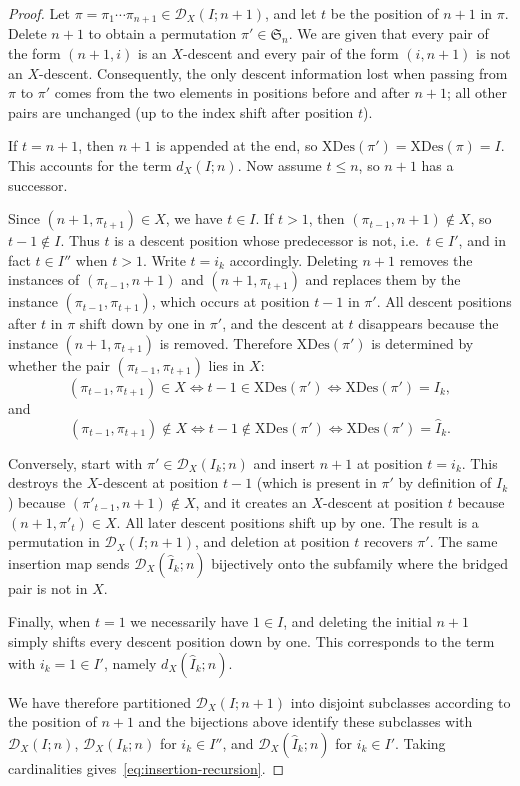 \documentclass[12pt]{amsart}
\theoremstyle{definition}
\theoremstyle{remark}
\newcommand{\Sset}{\mathfrak{S}}
\newcommand{\XD}{\mathrm{XDes}}
\begin{document}
\begin{proof}
Let \(\pi=\pi_1\cdots\pi_{n+1}\in\mathcal{D}_X(I;n{+}1)\), and let \(t\) be the position of \(n{+}1\) in \(\pi\).
Delete \(n{+}1\) to obtain a permutation \(\pi'\in\Sset_n\). We are given that every pair of the form \((n{+}1,i)\) is an \(X\)-descent
and every pair of the form \((i,n{+}1)\) is not an \(X\)-descent.
Consequently, the only descent information lost when passing from \(\pi\) to \(\pi'\) comes from the two elements in positions before and after \(n{+}1\); all other pairs are unchanged (up to the index shift after position \(t\)).

If \(t=n{+}1\), then \(n{+}1\) is appended at the end, so $\XD(\pi')=\XD(\pi)=I$.  This accounts for the term \(d_X(I;n)\). Now assume \(t\le n\), so \(n{+}1\) has a successor.  

Since \((n{+}1,\pi_{t+1})\in X\), we have \(t\in I\).
If \(t>1\), then \((\pi_{t-1},n{+}1)\notin X\), so \(t-1\notin I\).  Thus \(t\) is a descent position whose predecessor
is not, i.e.\ \(t\in I' \), and in fact \(t\in I''\) when \(t>1\).
Write \(t=i_k\) accordingly. Deleting \(n{+}1\) removes the instances of \((\pi_{t-1},n{+}1)\) and \((n{+}1,\pi_{t+1})\) and replaces them by the instance \((\pi_{t-1},\pi_{t+1})\), which occurs at position \(t-1\) in \(\pi'\).
All descent positions after $t$ in \(\pi\) shift down by one in \(\pi'\), and the descent at \(t\) disappears because the
instance \((n{+}1,\pi_{t+1})\) is removed.
Therefore \(\XD(\pi')\) is determined by whether the pair $(\pi_{t-1},\pi_{t+1})$ lies in \(X\):
\[
(\pi_{t-1},\pi_{t+1})\in X \Longleftrightarrow t-1\in\XD(\pi') \Longleftrightarrow \XD(\pi')=I_k,
\]
and
\[
(\pi_{t-1},\pi_{t+1})\notin X \Longleftrightarrow t-1\notin\XD(\pi') \Longleftrightarrow \XD(\pi')=\widehat{I}_k.
\]

Conversely, start with \(\pi'\in\mathcal{D}_X(I_k;n)\) and insert \(n{+}1\) at position \(t=i_k\).
This destroys the \(X\)-descent at position \(t-1\) (which is present in \(\pi'\) by definition of \(I_k\)) because
\((\pi'_{t-1},n{+}1)\notin X\), and it creates an \(X\)-descent at position \(t\) because \((n{+}1,\pi'_t)\in X\).
All later descent positions shift up by one.  The result is a permutation in \(\mathcal{D}_X(I;n{+}1)\), and deletion at
position \(t\) recovers \(\pi'\).  The same insertion map sends \(\mathcal{D}_X(\widehat{I}_k;n)\) bijectively onto the
subfamily where the bridged pair is not in \(X\).

Finally, when \(t=1\) we necessarily have \(1\in I\), and deleting the initial \(n{+}1\) simply shifts every descent
position down by one.  This corresponds to the term with \(i_k=1\in I'\), namely \(d_X(\widehat{I}_k;n)\).

We have therefore partitioned \(\mathcal{D}_X(I;n{+}1)\) into disjoint subclasses according to the position of \(n{+}1\)
and the bijections above identify these subclasses with
\(\mathcal{D}_X(I;n)\), \(\mathcal{D}_X(I_k;n)\) for \(i_k\in I''\), and \(\mathcal{D}_X(\widehat{I}_k;n)\) for \(i_k\in I'\). Taking cardinalities gives~\eqref{eq:insertion-recursion}.
\end{proof}
\end{document}
